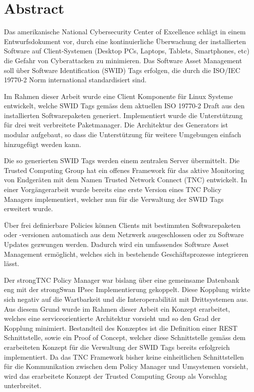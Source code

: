 \chapter{Abstract}

Das amerikanische National Cybersecurity Center of Excellence schlägt in einem
Entwurfsdokument vor, durch eine kontinuierliche Überwachung der installierten
Software auf Client-Systemen (Desktop PCs, Laptops, Tablets, Smartphones, etc)
die Gefahr von Cyberattacken zu minimieren. Das Software Asset Management soll
über Software Identification (SWID) Tags erfolgen, die durch die ISO/IEC 19770-2
Norm international standardisiert sind.

Im Rahmen dieser Arbeit wurde eine Client Komponente für Linux Systeme
entwickelt, welche SWID Tags gemäss dem aktuellen ISO 19770-2 Draft aus den
installierten Softwarepaketen generiert. Implementiert wurde die Unterstützung
für drei weit verbreitete Paketmanager. Die Architektur des Generators ist
modular aufgebaut, so dass die Unterstützung für weitere Umgebungen einfach
hinzugefügt werden kann.

Die so generierten SWID Tags werden einem zentralen Server übermittelt. Die
Trusted Computing Group hat ein offenes Framework für das aktive Monitoring von
Endgeräten mit dem Namen Trusted Network Connect (TNC) entwickelt. In einer
Vorgängerarbeit wurde bereits eine erste Version eines TNC Policy Managers
implementiert, welcher nun für die Verwaltung der SWID Tags erweitert wurde.

Über frei definierbare Policies können Clients mit bestimmten Softwarepaketen
oder -versionen automatisch aus dem Netzwerk ausgeschlossen oder zu Software
Updates gezwungen werden. Dadurch wird ein umfassendes Software Asset Management
ermöglicht, welches sich in bestehende Geschäftsprozesse integrieren lässt.

Der strongTNC Policy Manager war bislang über eine gemeinsame Datenbank eng mit
der strongSwan IPsec Implementierung gekoppelt. Diese Kopplung wirkte sich
negativ auf die Wartbarkeit und die Interoperabilität mit Drittsystemen aus. Aus
diesem Grund wurde im Rahmen dieser Arbeit ein Konzept erarbeitet, welches eine
serviceorientierte Architektur vorsieht und so den Grad der Kopplung minimiert.
Bestandteil des Konzeptes ist die Definition einer REST Schnittstelle, sowie ein
Proof of Concept, welcher diese Schnittstelle gemäss dem erarbeiteten Konzept für die
Verwaltung der SWID Tags bereits erfolgreich implementiert. Da das TNC Framework
bisher keine einheitlichen Schnittstellen für die Kommunikation zwischen dem
Policy Manager und Umsystemen vorsieht, wird das erarbeitete Konzept der Trusted
Computing Group als Vorschlag unterbreitet.

